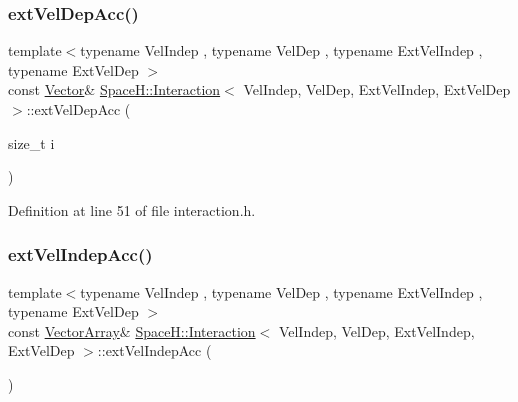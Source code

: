 \subsubsection{\texorpdfstring{ext\+Vel\+Dep\+Acc()}{extVelDepAcc()}\hspace{0.1cm}{\footnotesize\ttfamily [2/2]}}
{\footnotesize\ttfamily template$<$typename Vel\+Indep , typename Vel\+Dep , typename Ext\+Vel\+Indep , typename Ext\+Vel\+Dep $>$ \\
const \mbox{\hyperlink{class_space_h_1_1_interaction_ad6d656d30b9272a5f690b0412a4a9a86}{Vector}}\& \mbox{\hyperlink{class_space_h_1_1_interaction}{Space\+H\+::\+Interaction}}$<$ Vel\+Indep, Vel\+Dep, Ext\+Vel\+Indep, Ext\+Vel\+Dep $>$\+::ext\+Vel\+Dep\+Acc (\begin{DoxyParamCaption}\item[{size\+\_\+t}]{i }\end{DoxyParamCaption})\hspace{0.3cm}{\ttfamily [inline]}}



Definition at line 51 of file interaction.\+h.

\mbox{\label{class_space_h_1_1_interaction_a13f7c7f61c101a863c2dbedb17c31c2e}} 
\subsubsection{\texorpdfstring{ext\+Vel\+Indep\+Acc()}{extVelIndepAcc()}\hspace{0.1cm}{\footnotesize\ttfamily [1/2]}}
{\footnotesize\ttfamily template$<$typename Vel\+Indep , typename Vel\+Dep , typename Ext\+Vel\+Indep , typename Ext\+Vel\+Dep $>$ \\
const \mbox{\hyperlink{class_space_h_1_1_interaction_a9aaccf9a34d875881d9448acf7aaf009}{Vector\+Array}}\& \mbox{\hyperlink{class_space_h_1_1_interaction}{Space\+H\+::\+Interaction}}$<$ Vel\+Indep, Vel\+Dep, Ext\+Vel\+Indep, Ext\+Vel\+Dep $>$\+::ext\+Vel\+Indep\+Acc (\begin{DoxyParamCaption}{ }\end{DoxyParamCaption})\hspace{0.3cm}{\ttfamily [inline]}}



